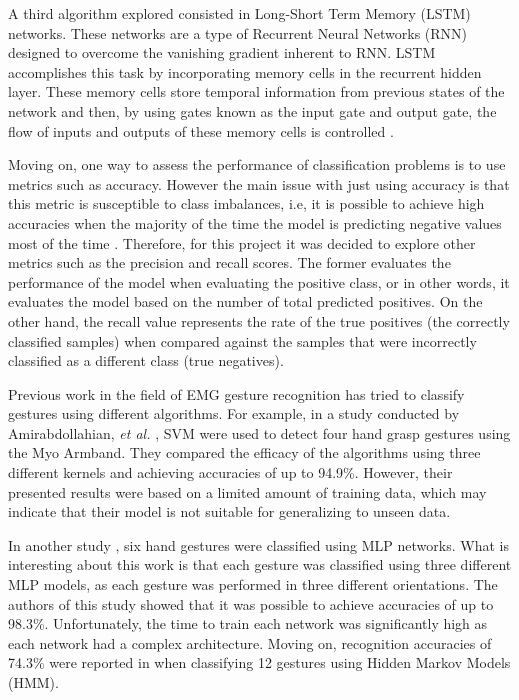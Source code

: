 \documentclass[journal]{IEEEtran}
\newcommand{\etal}{\emph{et al.}}
\begin{document}
	A third algorithm explored consisted in Long-Short Term Memory (LSTM) networks. These networks are a type of Recurrent Neural Networks (RNN) designed to overcome the vanishing gradient inherent to RNN. LSTM accomplishes this task by incorporating memory cells in the recurrent hidden layer. These memory cells store temporal information from previous states of the network and then, by using gates known as the input gate and output gate, the flow of inputs and outputs of these memory cells is controlled \cite{hochreiter1997}.
	
	Moving on, one way to assess the performance of classification problems is to use metrics such as accuracy. However the main issue with just using accuracy is that this metric is susceptible to class imbalances, i.e, it is possible to achieve high accuracies when the majority of the time the model is predicting negative values most of the time \cite{juba2019}. Therefore, for this project it was decided to explore other metrics such as the precision and recall scores. The former evaluates the performance of the model when evaluating the positive class, or in other words, it evaluates the model based on the number of total predicted positives. On the other hand, the recall value represents the rate of the true positives (the correctly classified samples) when compared against the samples that were incorrectly classified as a different class (true negatives).
	
	Previous work in the field of EMG gesture recognition has tried to classify gestures using different algorithms. For example, in a study conducted by Amirabdollahian, \etal{} \cite{amirabdollahian2017}, SVM were used to detect four hand grasp gestures using the Myo Armband. They compared the efficacy of the algorithms using three different kernels and achieving accuracies of up to 94.9\%. However, their presented results were based on a limited amount of training data, which may indicate that their model is not suitable for generalizing to unseen data. 
	
	In another study \cite{lima2018}, six hand gestures were classified using MLP networks. What is interesting about this work is that each gesture was classified using three different MLP models, as each gesture was performed in three different orientations. The authors of this study showed that it was possible to achieve accuracies of up to 98.3\%. Unfortunately, the time to train each network was significantly high as each network had a complex architecture. Moving on, recognition accuracies of 74.3\% were reported in \cite{georgi2015} when classifying 12 gestures using Hidden Markov Models (HMM). 
	
\end{document}
